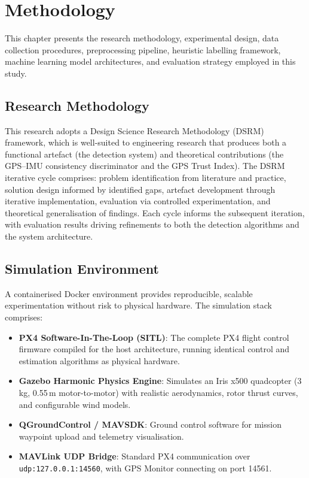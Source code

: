 \chapter{Methodology}

This chapter presents the research methodology, experimental design, data collection procedures, preprocessing pipeline, heuristic labelling framework, machine learning model architectures, and evaluation strategy employed in this study.

\section{Research Methodology}

This research adopts a Design Science Research Methodology (DSRM) framework, which is well-suited to engineering research that produces both a functional artefact (the detection system) and theoretical contributions (the GPS--IMU consistency discriminator and the GPS Trust Index). The DSRM iterative cycle comprises: problem identification from literature and practice, solution design informed by identified gaps, artefact development through iterative implementation, evaluation via controlled experimentation, and theoretical generalisation of findings. Each cycle informs the subsequent iteration, with evaluation results driving refinements to both the detection algorithms and the system architecture.

\section{Simulation Environment}

A containerised Docker environment provides reproducible, scalable experimentation without risk to physical hardware. The simulation stack comprises:

\begin{itemize}
    \item \textbf{PX4 Software-In-The-Loop (SITL)}: The complete PX4 flight control firmware compiled for the host architecture, running identical control and estimation algorithms as physical hardware.
    \item \textbf{Gazebo Harmonic Physics Engine}: Simulates an Iris x500 quadcopter (3\,kg, 0.55\,m motor-to-motor) with realistic aerodynamics, rotor thrust curves, and configurable wind models.
    \item \textbf{QGroundControl / MAVSDK}: Ground control software for mission waypoint upload and telemetry visualisation.
    \item \textbf{MAVLink UDP Bridge}: Standard PX4 communication over \texttt{udp:127.0.0.1:14560}, with GPS Monitor connecting on port 14561.
\end{itemize}

